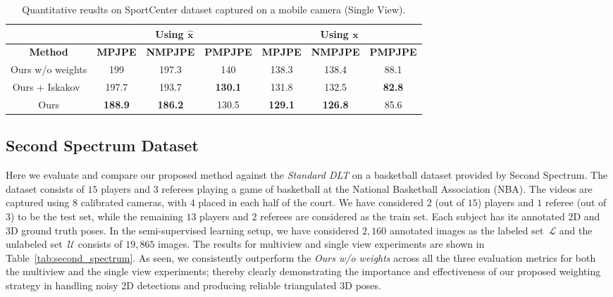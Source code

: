 \documentclass[runningheads]{llncs}
\def\Vec#1{{\boldsymbol{#1}}}
\newcommand{\mL}{\mathcal{L}}
\newcommand{\mU}{\mathcal{U}}
\newcommand{\bx}{\boldsymbol{x}}
\begin{document}
\begin{table*}[t]
\caption{Quantitative reuslts on SportCenter dataset captured on a mobile camera (Single View).}
\label{tab:sports_center_semi_supervised_mobile}
\begin{tabular}{c|ccc|ccc}
\toprule
& \multicolumn{3}{c|}{Using $\Vec{\hat x}$ } & \multicolumn{3}{c}{Using $\bx$} \\
 \midrule
\cmidrule{1-7}
	\textbf{Method} & \textbf{MPJPE} & \textbf{NMPJPE} & \textbf{PMPJPE} & \textbf{MPJPE} & \textbf{NMPJPE} & \textbf{PMPJPE} \\
		\midrule
Ours w/o weights & 199 & 197.3 & 140 & 138.3 & 138.4 & 88.1 \\
Ours + Iskakov~\cite{Iskakov19} & 197.7  & 193.7 & \textbf{130.1} & 131.8 & 132.5 & \textbf{82.8} \\
Ours & \textbf{188.9} & \textbf{186.2} & 130.5 & \textbf{129.1} & \textbf{126.8} & 85.6 \\

\bottomrule
\end{tabular}
\end{table*} 
\subsection{Second Spectrum Dataset}
Here we evaluate and compare our proposed method against the \emph{Standard DLT} on a basketball dataset provided by Second Spectrum. The dataset consists of $15$ players and $3$ referees playing a game of basketball at the National Basketball Association (NBA). The videos are captured using $8$ calibrated cameras, with $4$ placed in each half of the court. We have considered $2$ (out of $15$) players and $1$ referee (out of $3$) to be the test set, while the remaining $13$ players and $2$ referees are considered as the train set. Each subject has its annotated 2D and 3D ground truth poses. In the semi-supervised learning setup, we have considered $2,160$ annotated images as the labeled set~$\mL$ and the unlabeled set~$\mU$ consists of $19,865$ images. The results for multiview and single view experiments are shown in Table~\ref{tab:second_spectrum}. As seen, we consistently outperform the \emph{Ours w/o weights} across all the three evaluation metrics for both the multiview and the single view experiments; thereby clearly demonstrating the importance and effectiveness of our proposed weighting strategy in handling noisy 2D detections and producing reliable triangulated 3D poses.
\end{document}
